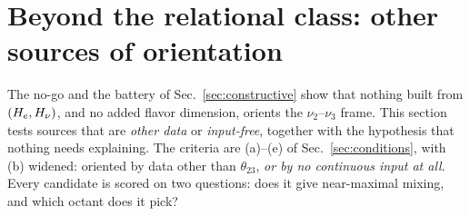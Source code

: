 
\section{Beyond the relational class: other sources of orientation}\label{sec:r2}
The no-go and the battery of Sec.~\ref{sec:constructive} show that nothing built from $(H_e,H_\nu)$,
and no added flavor dimension, orients the $\nu_2$--$\nu_3$ frame. This section tests sources that
are \emph{other data} or \emph{input-free}, together with the hypothesis that nothing needs
explaining. The criteria are (a)--(e) of Sec.~\ref{sec:conditions}, with (b) widened: oriented by
data other than $\theta_{23}$, \emph{or by no continuous input at all}. Every candidate is scored
on two questions: does it give near-maximal mixing, and which octant does it pick?

